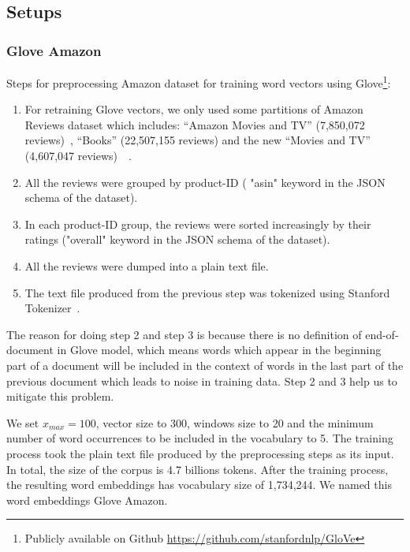 \subsection{Setups}
\subsubsection{Glove Amazon}
Steps for preprocessing Amazon dataset for training word vectors using Glove\footnote{Publicly available on Github \url{https://github.com/stanfordnlp/GloVe}}:
\begin{enumerate}
	\item For retraining Glove vectors, we only used some partitions of Amazon Reviews dataset which includes:  ``Amazon Movies and TV'' (7,850,072 reviews)~\cite{mcauley2013hidden}, ``Books'' (22,507,155 reviews) and the new ``Movies and TV'' (4,607,047 reviews)~\cite{McAuleyTSH15}~\cite{HeM16}.
	\item All the reviews were grouped by product-ID ( "asin" keyword in the JSON schema of the dataset).
	\item In each product-ID group, the reviews were sorted increasingly by their ratings ("overall" keyword in the JSON schema of the dataset).
	\item All the reviews were dumped into a plain text file.
	\item The text file produced from the previous step was tokenized using Stanford Tokenizer~\cite{tokenizerpart}.
\end{enumerate}

The reason for doing step 2 and step 3 is because there is no definition of end-of-document in Glove model, which means words which appear in the beginning part of a document will be included in the context of words in the last part of the previous document which leads to noise in training data. Step 2 and 3 help us to mitigate this problem.

We set $x_{max} = 100$, vector size to 300, windows size to 20 and the minimum number of word occurrences to be included in the vocabulary to 5.
The training process took the plain text file produced by the preprocessing steps as its input.
In total, the size of the corpus is 4.7 billions tokens.
After the training process, the resulting word embeddings has vocabulary size of 1,734,244.
We named this word embeddings Glove Amazon.
